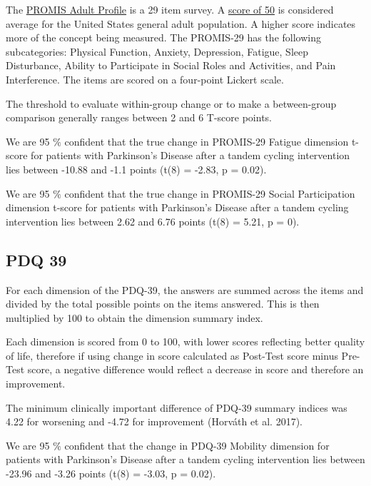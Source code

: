 \documentclass[
]{article}
\begin{document}
The
\href{https://www.healthmeasures.net/images/PROMIS/manuals/Scoring_Manuals_/PROMIS_Adult_Profile_Scoring_Manual.pdf}{PROMIS
Adult Profile} is a 29 item survey. A
\href{https://staging.healthmeasures.net/score-and-interpret/interpret-scores/promis/promis-score-cut-points}{score
of 50} is considered average for the United States general adult
population. A higher score indicates more of the concept being measured.
The PROMIS-29 has the following subcategories: Physical Function,
Anxiety, Depression, Fatigue, Sleep Disturbance, Ability to Participate
in Social Roles and Activities, and Pain Interference. The items are
scored on a four-point Lickert scale.

The threshold to evaluate within-group change or to make a between-group
comparison generally ranges between 2 and 6 T-score points.

We are 95 \(\%\) confident that the true change in PROMIS-29 Fatigue
dimension t-score for patients with Parkinson's Disease after a tandem
cycling intervention lies between -10.88 and -1.1 points (t(8) = -2.83,
p = 0.02).

We are 95 \(\%\) confident that the true change in PROMIS-29 Social
Participation dimension t-score for patients with Parkinson's Disease
after a tandem cycling intervention lies between 2.62 and 6.76 points
(t(8) = 5.21, p = 0).

\hypertarget{pdq-39}{%
\subsection{PDQ 39}\label{pdq-39}}

For each dimension of the PDQ-39, the answers are summed across the
items and divided by the total possible points on the items answered.
This is then multiplied by 100 to obtain the dimension summary index.

Each dimension is scored from 0 to 100, with lower scores reflecting
better quality of life, therefore if using change in score calculated as
Post-Test score minus Pre-Test score, a negative difference would
reflect a decrease in score and therefore an improvement.

The minimum clinically important difference of PDQ-39 summary indices
was 4.22 for worsening and -4.72 for improvement (Horváth et al. 2017).

We are 95 \(\%\) confident that the change in PDQ-39 Mobility dimension
for patients with Parkinson's Disease after a tandem cycling
intervention lies between -23.96 and -3.26 points (t(8) = -3.03, p =
0.02).
\end{document}
